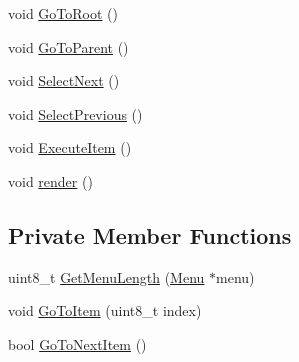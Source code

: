 \begin{DoxyCompactItemize}
\item 
void \hyperlink{class_menu_1_1_controller_a787911ef46ca1968c2fd667af1f9ac27}{Go\+To\+Root} ()
\item 
void \hyperlink{class_menu_1_1_controller_ab30a038c4e4e3cb102d419c11a6813f6}{Go\+To\+Parent} ()
\item 
void \hyperlink{class_menu_1_1_controller_a9aabc6ba652c29efa7a02e12f51ce0b1}{Select\+Next} ()
\item 
void \hyperlink{class_menu_1_1_controller_a04e3448cfe4341ad7209a9f16bbcb449}{Select\+Previous} ()
\item 
void \hyperlink{class_menu_1_1_controller_a0dda40652b8802a8fe39c1ce61a66f1a}{Execute\+Item} ()
\item 
void \hyperlink{class_menu_1_1_controller_ac35f61a344381d3420cae49e2fec829d}{render} ()
\end{DoxyCompactItemize}
\subsection*{Private Member Functions}
\begin{DoxyCompactItemize}
\item 
uint8\+\_\+t \hyperlink{class_menu_1_1_controller_a24009cee76b147079041b2130a806027}{Get\+Menu\+Length} (\hyperlink{struct_menu_1_1_menu}{Menu} $\ast$menu)
\item 
void \hyperlink{class_menu_1_1_controller_afa4a1e26efe90dd5d9479bb8c84404b6}{Go\+To\+Item} (uint8\+\_\+t index)
\item 
bool \hyperlink{class_menu_1_1_controller_ad93989bb6a9ed55f67ad5c15e666cf39}{Go\+To\+Next\+Item} ()
\end{DoxyCompactItemize}
